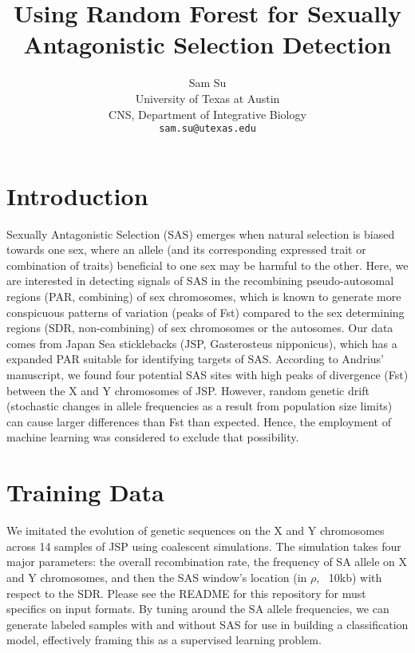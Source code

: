 \documentclass[10pt]{article}
\title{Using Random Forest for Sexually Antagonistic Selection Detection}
\author{
  Sam Su \\
  University of Texas at Austin \\
  CNS, Department of Integrative Biology \\
  {\tt sam.su@utexas.edu} \\}
\date{}
\begin{document}
\maketitle

%

\section{Introduction}

Sexually Antagonistic Selection (SAS) emerges when natural selection is biased towards one sex, where an allele (and its corresponding expressed trait or combination of traits) beneficial to one sex may be harmful to the other. Here, we are interested in detecting signals of SAS in the recombining pseudo-autosomal regions (PAR, combining) of sex chromosomes, which is known to generate more conspicuous patterns of variation (peaks of Fst) compared to the sex determining regions (SDR, non-combining) of sex chromosomes or the autosomes. Our data comes from Japan Sea sticklebacks (JSP, Gasterosteus nipponicus), which has a expanded PAR suitable for identifying targets of SAS. According to Andrius' manuscript, we found four potential SAS sites with high peaks of divergence (Fst) between the X and Y chromosomes of JSP. However, random genetic drift (stochastic changes in allele frequencies as a result from population size limits) can cause larger differences than Fst than expected. Hence, the employment of machine learning was considered to exclude that possibility. 

\section{Training Data}

We imitated the evolution of genetic sequences on the X and Y chromosomes across 14 samples of JSP using coalescent simulations. The simulation takes four major parameters: the overall recombination rate, the frequency of SA allele on X and Y chromosomes, and then the SAS window's location (in $\rho$, ~10kb) with respect to the SDR. Please see the README for this repository for must specifics on input formats. By tuning around the SA allele frequencies, we can generate labeled samples with and without SAS for use in building a classification model, effectively framing this as a supervised learning problem. 
\end{document}
